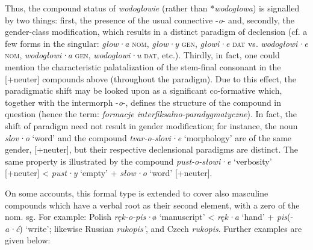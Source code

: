 \documentclass[output=paper]{LSP/langsci}
\begin{document}
Thus, the compound status of \textit{wodogłowie} (rather than *\textit{wodogłowa}) is signalled by two things: first, the presence of the usual connective -\textit{o}- and, secondly, the gender-class modification, which results in a distinct paradigm of declension (cf. a few forms in the singular: {\textit{głow}}{\textit·}{\textit{a}} \textsc{nom}, {\textit{głow}}{\textit·}{\textit{y}} \textsc{gen}, {\textit{głowi}}{\textit·}{\textit{e}} \textsc{dat} vs. {\textit{wodogłowi}}{\textit·}{\textit{e}} \textsc{nom}, {\textit{wodogłowi}}{\textit·}{\textit{a}} \textsc{gen}, {\textit{wodogłowi}}{\textit·}{\textit{u}} \textsc{dat}, etc.). Thirdly, in fact, one could mention the characteristic palatalization of the stem-final consonant in the [+neuter] compounds above (throughout the paradigm). Due to this effect, the paradigmatic shift may be looked upon as a significant co-formative which, together with the intermorph -{\textit{o}}{-, defines the structure of the compound in question (hence the  term:} {\textit{formacje interfiksalno-paradygmatyczne}}{). In fact, the shift of paradigm need not result in gender modification; for instance, the  noun} {\textit{slov}}{\textit·}{\textit{o}} {‘word’ and the compound} {\textit{tvar-o-slovi}}{\textit·}{\textit{e}} {‘morphology’ are of the same gender, [+neuter], but their respective declensional paradigms are distinct. The same property is illustrated by the  compound} {\textit{pust-o-słowi}}{\textit·}{\textit{e}} {‘verbosity’ [+neuter] <} {\textit{pust}}{\textit·}{\textit{y}} {‘empty’ +} {\textit{słow}}{\textit·}{\textit{o}} {‘word’ [+neuter].}

{On some accounts, this formal type is extended to cover also masculine compounds which have a verbal root as their second element, with a zero  of the nom. sg. For example: Polish} {\textit{ręk-o-pis}}{\textit·}{ø ‘manuscript’ <} {\textit{ręk}}{\textit·}{\textit{a}} {‘hand’ +} {\textit{pis}}{(-}{\textit{a}}{\textit·}{\textit{ć}}{) ‘write’; likewise Russian} {\textit{rukopis’}}{,  and Czech} {\textit{rukopis}}{. Further  examples are given below:}
\end{document}

